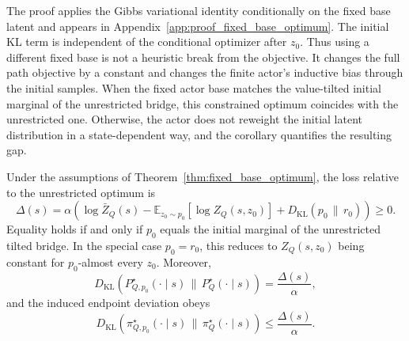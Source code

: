 \documentclass[11pt]{article}
\begin{document}
The proof applies the Gibbs variational identity conditionally on the fixed base latent and appears in Appendix~\ref{app:proof_fixed_base_optimum}. The initial KL term is independent of the conditional optimizer after $z_0$. Thus using a different fixed base is not a heuristic break from the objective. It changes the full path objective by a constant and changes the finite actor's inductive bias through the initial samples. When the fixed actor base matches the value-tilted initial marginal of the unrestricted bridge, this constrained optimum coincides with the unrestricted one. Otherwise, the actor does not reweight the initial latent distribution in a state-dependent way, and the corollary quantifies the resulting gap.

\begin{corollary}
Under the assumptions of Theorem~\ref{thm:fixed_base_optimum}, the loss relative to the unrestricted optimum is
\begin{equation}
  \Delta(s)
  =
  \alpha
  \left(
    \log \bar Z_Q(s)
    -
    \mathbb E_{z_0\sim p_0}
    \left[
      \log Z_Q(s,z_0)
    \right]
    +
    D_{\mathrm{KL}}
    \left(
      p_0
      \,\|\,
      r_0
    \right)
  \right)
  \ge 0.
  \label{eq:base_jensen_gap}
\end{equation}
Equality holds if and only if $p_0$ equals the initial marginal of the unrestricted tilted bridge. In the special case $p_0=r_0$, this reduces to $Z_Q(s,z_0)$ being constant for $p_0$-almost every $z_0$. Moreover,
\begin{equation}
  D_{\mathrm{KL}}
  \left(
    P_{Q,p_0}^\star(\cdot\mid s)
    \,\|\,P_Q^\star(\cdot\mid s)
  \right)
  =
  \frac{
    \Delta(s)
  }{
    \alpha
  },
  \label{eq:shared_base_path_bound}
\end{equation}
and the induced endpoint deviation obeys
\begin{equation}
  D_{\mathrm{KL}}
  \left(
    \pi_{Q,p_0}^\star(\cdot\mid s)
    \,\|\,\pi_Q^\star(\cdot\mid s)
  \right)
  \le
  \frac{
    \Delta(s)
  }{
    \alpha
  }.
  \label{eq:shared_base_endpoint_bound}
\end{equation}
\end{corollary}
\end{document}
